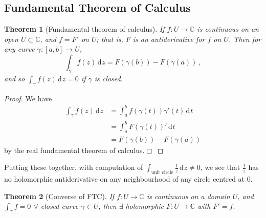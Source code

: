 \documentclass{article}
\theoremstyle{plain}\theoremheaderfont{\normalfont\itshape}\theorembodyfont{\rmfamily}\theoremseparator{.}\newtheorem*{rem}{Remark}\newtheorem*{ex}{Example}\newtheorem*{proof}{Proof}\newtheorem*{altp}{Alternative proof}\newtheorem*{con}{Consequences}\newtheorem*{notn}{Notations}\newtheorem*{cau}{Caution}\newtheorem*{term}{Terminology}\newtheorem*{keyex}{Key example}
\theoremstyle{plain}\theoremheaderfont{\normalfont\bfseries}\theorembodyfont{\rmfamily}\theoremseparator{.}\newtheorem{thm}{Theorem}[section]\newtheorem{lem}[thm]{Lemma}\newtheorem{prop}[thm]{Proposition}\newtheorem*{cor}{Corollary}\newtheorem{defn}[thm]{Definition}\newtheorem{clm}[thm]{Claim}\newtheorem{clminproof}{Claim}\newtheorem{leminproof}{Lemma}\newtheorem{app}{Application}
\theoremstyle{break}\theoremheaderfont{\normalfont\itshape}\theorembodyfont{\rmfamily}\theoremseparator{.\medskip}\newtheorem*{proofskip}{Proof}\newtheorem*{exs}{Examples}\newtheorem*{rems}{Remarks}\newtheorem*{rec}{Recall}\newtheorem*{ppts}{Properties}
\theoremstyle{break}\theoremheaderfont{\normalfont\bfseries}\theorembodyfont{\rmfamily}\theoremseparator{.\medskip}\newtheorem{lemskip}[thm]{Lemma}\newtheorem{defnskip}[thm]{Definition}\newtheorem{propskip}[thm]{Proposition}\newtheorem{thmskip}[thm]{Theorem}
\numberwithin{equation}{section}
\newcommand{\qed}{\hfill\ensuremath{\Box}}
\newcommand{\dd}[2][]{\,\mathrm{d}^{#1} #2}
\newcommand{\CC}{\mathbb{C}}
\begin{document}
    \subsection{Fundamental Theorem of Calculus}
    \begin{thm}[Fundamental theorem of calculus]
        If \(f:U\to\CC\) is continuous on an open \(U\subset\CC\), and \(f=F'\) on \(U\); that is, \(F\) is an antiderivative for \(f\) on \(U\). Then for any curve \(\gamma:[a,b]\to U\),
        \[\int_\gamma f(z)\dd{z}=F(\gamma(b))-F(\gamma(a))\,,\]
        and so \(\int_{\gamma}f(z)\dd{z}=0\) if \(\gamma\) is closed.
    \end{thm}
    \begin{proof}
        We have
        \begin{align*}
            \int_\gamma f(z)\dd{z}&=\int_{a}^{b}f(\gamma(t))\gamma'(t)\dd{t}\\
            &=\int_{a}^{b}F(\gamma(t))'\dd{t}\\
            &=F(\gamma(b))-F(\gamma(a))
        \end{align*}
        by the real fundamental theorem of calculus.\qed
    \end{proof}
    Putting these together, with computation of \(\int_{\text{unit circle}}\frac{1}{z}\dd{z}\ne 0\), we see that \(\frac{1}{z}\) has no holomorphic antiderivative on any neighbourhood of any circle centred at 0.
    \begin{thm}[Converse of FTC]
        If \(f:U\to\CC\) is continuous on a domain \(U\), and \(\int_\gamma f=0\) \(\forall\) closed curve \(\gamma\in U\), then \(\exists\) holomorphic \(F:U\to\CC\) with \(F'=f\).
    \end{thm}
\end{document}
